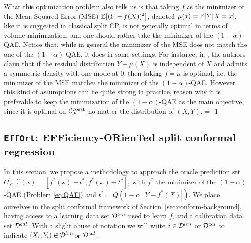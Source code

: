 What this optimization problem also tells us is that taking $f$ as the minimizer of the Mean Squared Error (MSE) $\mathbb{E}[(Y-f(X))^2]$, denoted $\mu(x) = \mathbb{E}[Y|X=x]$, like it is suggested in classical split CP, is not generally optimal in terms of volume minimization, and one should rather take the minimizer of the $(1-\alpha)$-QAE. Notice that, while in general the minimizer of the MSE does not match the one of the $(1-\alpha)$-QAE,
it does in some settings. For instance, in \citet[Section 3]{lei2018distribution}, the authors claim %
that if the residual distribution $Y-\mu(X)$ is independent of $X$ and admits a symmetric density with one mode at $0$, then taking $f=\mu$ is optimal, i.e. the minimizer of the MSE matches the minimizer of the $(1-\alpha)$-QAE. However, this kind of assumptions can be quite strong in practice, reason why it is preferable to keep the minimization of the $(1-\alpha)$-QAE as the main objective, since it is optimal on ${\cal C}^{\text{const}}_{\mathcal{F}}$ no matter the distribution of $(X,Y)$. \looseness = -1


\subsection{\texttt{EffOrt}: EFFiciency-ORienTed split conformal regression}
In this section, we propose a methodology to approach the oracle prediction set $C^{1-\alpha}_{f^*,t^*}(x) = [f^*(x) - t^*, f^*(x) + t^*]$, with $f^*$ the minimizer of the $(1-\alpha)$-QAE (Problem \eqref{eq:QAE}) and $t^* = Q(1-\alpha ; |Y-f^*(X)|)$. We place ourselves in the split conformal framework of Section~\ref{sec:conform-background}, having access to a learning data set ${\cal D}^{lrn}$ used to learn $f$, and a calibration data set ${\cal D}^{cal}$. With a slight abuse of notation we will write $i\in{\cal D}^{lrn}$ or ${\cal D}^{cal}$ to indicate $(X_i,Y_i)\in{\cal D}^{lrn}$or ${\cal D}^{cal}$.


